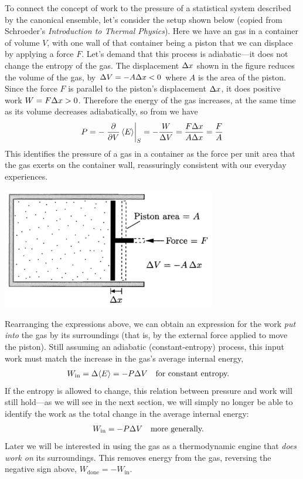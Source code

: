 To connect the concept of work to the pressure of a statistical system described by the canonical ensemble, let's consider the setup shown below (copied from Schroeder's \textit{Introduction to Thermal Physics}).
Here we have an gas in a container of volume $V$, with one wall of that container being a piston that we can displace by applying a force $F$.
Let's demand that this process is adiabatic---it does not change the entropy of the gas.
The displacement $\Delta x$ shown in the figure reduces the volume of the gas, by $\Delta V = -A\Delta x < 0$ where $A$ is the area of the piston.
Since the force $F$ is parallel to the piston's displacement $\Delta x$, it does positive work $W = F\Delta x > 0$.
Therefore the energy of the gas increases, at the same time as its volume decreases adiabatically, so from  we have
\begin{equation}
  P = -\left. \frac{\partial }{\partial V} \left\langle E \right\rangle\right|_S = -\frac{W}{\Delta V} = \frac{F\Delta x}{A\Delta x} = \frac{F}{A}
\end{equation}
This identifies the pressure of a gas in a container as the force per unit area that the gas exerts on the container wall, reassuringly consistent with our everyday experiences.

\begin{center}
  \includegraphics[width=0.7\textwidth]{figs/week05_piston.pdf}
\end{center}

Rearranging the expressions above, we can obtain an expression for the work \textit{put into} the gas by its surroundings (that is, by the external force applied to move the piston).
Still assuming an adiabatic (constant-entropy) process, this input work must match the increase in the gas's average internal energy,
\begin{align*}
  W_{\text{in}} & = \Delta\!\left\langle E \right\rangle = -P \Delta V & & \mbox{for constant entropy.}
\end{align*}
If the entropy is allowed to change, this relation between pressure and work will still hold---as we will see in the next section, we will simply no longer be able to identify the work as the total change in the average internal energy:
\begin{align}
  \label{eq:work_constP}
  W_{\text{in}} & = -P \Delta V & & \mbox{more generally.}
\end{align}
Later we will be interested in using the gas as a thermodynamic engine that \textit{does work on} its surroundings.
This removes energy from the gas, reversing the negative sign above, $W_{\text{done}} = -W_{\text{in}}$.

